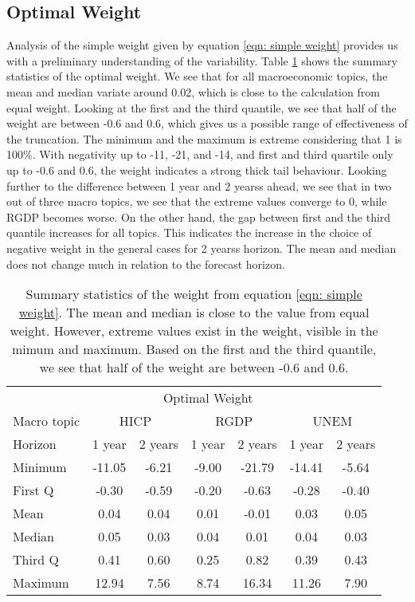 \documentclass[11pt]{article}
\begin{document}
\subsection{Optimal Weight}\label{optimal-weight}
Analysis of the simple weight given by equation
\ref{eqn: simple weight} provides us with a preliminary understanding of the
variability. Table \ref{tab: simple weight summary statistics} shows the
summary statistics of the optimal weight. We see that for all macroeconomic
topics, the mean and median variate around 0.02, which is close to the
calculation from equal weight. Looking at the first and the third
quantile, we see that half of the weight are between -0.6 and 0.6,
which gives us a possible range of effectiveness of the truncation. The
minimum and the maximum is extreme considering that 1 is 100\%. With
negativity up to -11, -21, and -14, and first and third quartile only up
to -0.6 and 0.6, the weight indicates a strong thick tail behaviour.
Looking further to the difference between 1 year and 2 yearss ahead, we
see that in two out of three macro topics, we see that the extreme
values converge to 0, while RGDP becomes worse. On the other hand, the
gap between first and the third quantile increases for all topics. This
indicates the increase in the choice of negative weight in the general
cases for 2 yearss horizon. The mean and median does not change much in
relation to the forecast horizon.

\begin{table}[!h]
	\centering
	\caption{Summary statistics of the weight from equation \ref{eqn: simple weight}. The mean and median is close to the value from equal weight. However, extreme values exist in the weight, visible in the mimum and maximum. Based on the first and the third quantile, we see that half of the weight are between -0.6 and 0.6.}
	\label{tab: simple weight summary statistics}
	\begin{tabular}{lcccccc}%
		\hline
		&\multicolumn{5}{c}{Optimal Weight}\\
		\cmidrule(lr){2-7}
		Macro topic & \multicolumn{2}{c}{HICP} & \multicolumn{2}{c}{RGDP} & \multicolumn{2}{c}{UNEM} \\
		\cmidrule(lr){2-3} \cmidrule(lr){4-5}\cmidrule(lr){6-7}
		Horizon     & 1 year & 2 years & 1 year & 2 years & 1 year & 2 years \\ 
		\hline
		Minimum      & -11.05      & -6.21      & -9.00      & -21.79      & -14.41      & -5.64      \\
		First Q      & -0.30       & -0.59      & -0.20      & -0.63       & -0.28       & -0.40      \\
		Mean         & 0.04        & 0.04       & 0.01       & -0.01       & 0.03        & 0.05       \\
		Median       & 0.05        & 0.03       & 0.04       & 0.01        & 0.04        & 0.03       \\
		Third Q      & 0.41        & 0.60       & 0.25       & 0.82        & 0.39        & 0.43       \\
		Maximum      & 12.94       & 7.56       & 8.74       & 16.34       & 11.26       & 7.90       \\ 
		\hline
	\end{tabular}
\end{table}
\end{document}

